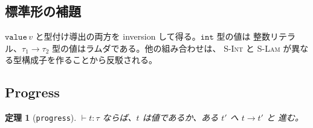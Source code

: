 \documentclass[11pt,a4paper]{ltjsarticle}
\newtheorem{theorem}{定理}
\newcommand{\tint}{\mathtt{int}}
\newcommand{\step}{\longrightarrow}
\begin{document}
\subsection{標準形の補題}

$\mathtt{value}\,v$ と型付け導出の両方を inversion して得る。$\tint$ 型の値は
整数リテラル、$\tau_1 \to \tau_2$ 型の値はラムダである。他の組み合わせは、
\textsc{S-Int} と \textsc{S-Lam} が異なる型構成子を作ることから反駁される。

\subsection{Progress}

\begin{theorem}[\texttt{progress}]
  $\vdash t : \tau$ ならば、$t$ は値であるか、ある $t'$ へ $t \step t'$ と
  進む。
\end{theorem}
\end{document}
